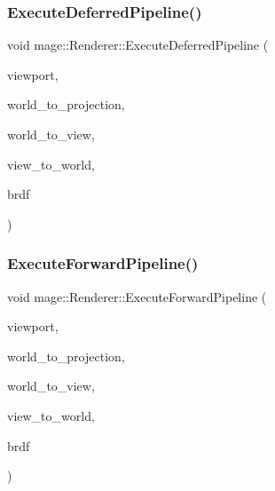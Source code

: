 \subsubsection{\texorpdfstring{Execute\+Deferred\+Pipeline()}{ExecuteDeferredPipeline()}}
{\footnotesize\ttfamily void mage\+::\+Renderer\+::\+Execute\+Deferred\+Pipeline (\begin{DoxyParamCaption}\item[{const \hyperlink{classmage_1_1_viewport}{Viewport} \&}]{viewport,  }\item[{F\+X\+M\+M\+A\+T\+R\+IX}]{world\+\_\+to\+\_\+projection,  }\item[{C\+X\+M\+M\+A\+T\+R\+IX}]{world\+\_\+to\+\_\+view,  }\item[{C\+X\+M\+M\+A\+T\+R\+IX}]{view\+\_\+to\+\_\+world,  }\item[{\hyperlink{namespacemage_ae7a7a03a7b34d7e2689689bb8295cd38}{B\+R\+D\+F\+Type}}]{brdf }\end{DoxyParamCaption})\hspace{0.3cm}{\ttfamily [private]}}

\hypertarget{classmage_1_1_renderer_a37abb92510abee24538a556d0ef6c0c2}{}\label{classmage_1_1_renderer_a37abb92510abee24538a556d0ef6c0c2} 
\subsubsection{\texorpdfstring{Execute\+Forward\+Pipeline()}{ExecuteForwardPipeline()}}
{\footnotesize\ttfamily void mage\+::\+Renderer\+::\+Execute\+Forward\+Pipeline (\begin{DoxyParamCaption}\item[{const \hyperlink{classmage_1_1_viewport}{Viewport} \&}]{viewport,  }\item[{F\+X\+M\+M\+A\+T\+R\+IX}]{world\+\_\+to\+\_\+projection,  }\item[{C\+X\+M\+M\+A\+T\+R\+IX}]{world\+\_\+to\+\_\+view,  }\item[{C\+X\+M\+M\+A\+T\+R\+IX}]{view\+\_\+to\+\_\+world,  }\item[{\hyperlink{namespacemage_ae7a7a03a7b34d7e2689689bb8295cd38}{B\+R\+D\+F\+Type}}]{brdf }\end{DoxyParamCaption})\hspace{0.3cm}{\ttfamily [private]}}

